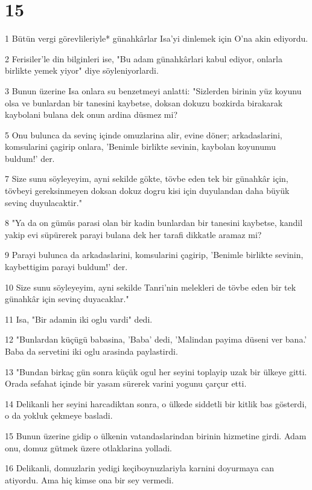 \chapter{15}

\par 1 Bütün vergi görevlileriyle* günahkârlar Isa'yi dinlemek için O'na akin ediyordu.
\par 2 Ferisiler'le din bilginleri ise, "Bu adam günahkârlari kabul ediyor, onlarla birlikte yemek yiyor" diye söyleniyorlardi.
\par 3 Bunun üzerine Isa onlara su benzetmeyi anlatti: "Sizlerden birinin yüz koyunu olsa ve bunlardan bir tanesini kaybetse, doksan dokuzu bozkirda birakarak kaybolani bulana dek onun ardina düsmez mi?
\par 5 Onu bulunca da sevinç içinde omuzlarina alir, evine döner; arkadaslarini, komsularini çagirip onlara, 'Benimle birlikte sevinin, kaybolan koyunumu buldum!' der.
\par 7 Size sunu söyleyeyim, ayni sekilde gökte, tövbe eden tek bir günahkâr için, tövbeyi gereksinmeyen doksan dokuz dogru kisi için duyulandan daha büyük sevinç duyulacaktir."
\par 8 "Ya da on gümüs parasi olan bir kadin bunlardan bir tanesini kaybetse, kandil yakip evi süpürerek parayi bulana dek her tarafi dikkatle aramaz mi?
\par 9 Parayi bulunca da arkadaslarini, komsularini çagirip, 'Benimle birlikte sevinin, kaybettigim parayi buldum!' der.
\par 10 Size sunu söyleyeyim, ayni sekilde Tanri'nin melekleri de tövbe eden bir tek günahkâr için sevinç duyacaklar."
\par 11 Isa, "Bir adamin iki oglu vardi" dedi.
\par 12 "Bunlardan küçügü babasina, 'Baba' dedi, 'Malindan payima düseni ver bana.' Baba da servetini iki oglu arasinda paylastirdi.
\par 13 "Bundan birkaç gün sonra küçük ogul her seyini toplayip uzak bir ülkeye gitti. Orada sefahat içinde bir yasam sürerek varini yogunu çarçur etti.
\par 14 Delikanli her seyini harcadiktan sonra, o ülkede siddetli bir kitlik bas gösterdi, o da yokluk çekmeye basladi.
\par 15 Bunun üzerine gidip o ülkenin vatandaslarindan birinin hizmetine girdi. Adam onu, domuz gütmek üzere otlaklarina yolladi.
\par 16 Delikanli, domuzlarin yedigi keçiboynuzlariyla karnini doyurmaya can atiyordu. Ama hiç kimse ona bir sey vermedi.
